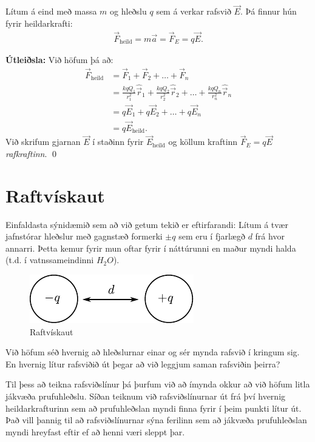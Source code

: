 \ifdefined \wholebook \else\documentclass[oneside]{book}\usepackage{EdlBook}\graphicspath{{figures/}}
\begin{document}
\begin{tcolorbox}
\begin{theorem}
Lítum á eind með massa $m$ og hleðslu $q$ sem á verkar rafsvið $\vec{E}$. Þá finnur hún fyrir heildarkrafti:
\begin{align*}
    \vec{F}_{\text{heild}} = m\vec{a} = \vec{F}_{E} = q\vec{E}.
\end{align*}
\end{theorem}
\end{tcolorbox}

\textbf{Útleiðsla:} Við höfum þá að:
\begin{align*}
    \vec{F}_{\text{heild}} &= \vec{F}_1 + \vec{F}_2 + \ldots + \vec{F}_n \\
    &= \frac{kqQ_1}{r_1^2} \hat{\vec{r}}_1 + \frac{kqQ_2}{r_2^2} \hat{\vec{r}}_2 + \ldots + \frac{kqQ_n}{r_n^2} \hat{\vec{r}}_n \\
    &= q\vec{E}_1 + q\vec{E}_2 + \ldots + q \vec{E}_n \\
    &= q \vec{E}_{\text{heild}}.
\end{align*}
Við skrifum gjarnan $\vec{E}$ í staðinn fyrir $\vec{E}_{\text{heild}}$ og köllum kraftinn $\vec{F}_E = q\vec{E}$ \emph{rafkraftinn}. \qed



\section{Raftvískaut}

Einfaldasta sýnidæmið sem að við getum tekið er eftirfarandi: Lítum á tvær jafnstórar hleðslur með gagnstæð formerki $\pm q$ sem eru í fjarlægð $d$ frá hvor annarri. Þetta kemur fyrir mun oftar fyrir í náttúrunni en maður myndi halda (t.d. í vatnssameindinni $H_2 O$). 

\begin{figure}[H]
    \centering
    \includegraphics{tviskaut.pdf}
    \caption{Raftvískaut}
\end{figure}

Við höfum séð hvernig að hleðslurnar einar og sér mynda rafsvið í kringum sig. En hvernig lítur rafsviðið út þegar að við leggjum saman rafsviðin þeirra?

Til þess að teikna rafsviðslínur þá þurfum við að ímynda okkur að við höfum litla jákvæða prufuhleðslu. Síðan teiknum við rafsviðslínurnar út frá því hvernig heildarkrafturinn sem að prufuhleðslan myndi finna fyrir í þeim punkti lítur út. Það vill þannig til að rafsviðslínurnar sýna ferilinn sem að jákvæða prufuhleðslan myndi hreyfast eftir ef að henni væri sleppt þar.
\end{document}
